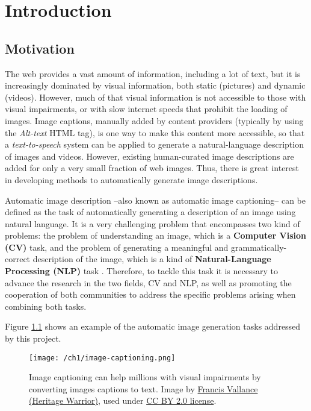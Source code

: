 \chapter{Introduction}
\label{chapter:introduccion}

\section{Motivation}

The web provides a vast amount of information, including a lot of text, but it is increasingly dominated by visual information, both static (pictures) and dynamic (videos).  However, much of that visual information is not accessible to those with visual impairments, or with slow internet speeds that prohibit the loading of images. Image captions, manually added by content providers (typically by using the \textit{ Alt-text} HTML tag), is one way to make this content more accessible, so that a \textit{text-to-speech} system can be applied to generate a natural-language description of images and videos. However, existing human-curated image descriptions are added for only a very small fraction of web images. Thus, there is great interest in developing methods to automatically generate image descriptions.

Automatic image description --also known as automatic image captioning-- can be defined as the task of automatically generating a description of an image using natural language. It is a very challenging problem that encompasses two kind of problems: the problem of understanding an image, which is a \textbf{Computer Vision (CV)} task, and the problem of generating a meaningful and grammatically-correct description of the image, which is a kind of \textbf{Natural-Language Processing (NLP)} task . Therefore, to tackle this task it is necessary to advance the research in the two fields, CV and NLP, as well as promoting the cooperation of both communities to address the specific problems arising when combining both tasks.

Figure \ref{fig:image-captioning} shows an example of the automatic image generation tasks addressed by this project.

\begin{figure}[h]
	\centering
	\texttt{[image: /ch1/image-captioning.png]}
	\caption{Image captioning can help millions with visual impairments by converting images captions to text. Image by \href{https://www.flickr.com/photos/francisvallance/}{Francis Vallance (Heritage Warrior)}, used under \href{https://creativecommons.org/licenses/by/2.0/}{CC BY 2.0 license}.}
	\label{fig:image-captioning}
\end{figure}

